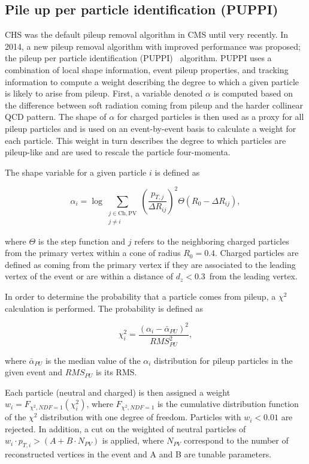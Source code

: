 \subsection{Pile up per particle identification (PUPPI)}
\label{subsub:objreco:puppi}
CHS was the default pileup removal algorithm in CMS until very recently. In 2014, a new pileup removal algorithm with improved performance was proposed; the pileup per particle identification (PUPPI)~\cite{Bertolini2014} algorithm.
PUPPI uses a combination of local shape information, event pileup properties, and tracking information to compute a weight describing the degree to which a given particle is likely to arise from pileup.
First, a variable denoted $\alpha$ is computed based on the difference between soft radiation coming from pileup and the harder collinear QCD pattern. The shape of $\alpha$ for charged particles is then used as a proxy for all pileup particles and is used on an event-by-event basis to calculate a weight for each particle. This weight in turn describes the degree to which particles are pileup-like and are used to rescale the particle four-momenta.

The shape variable for a given particle $i$ is defined as

\begin{equation}
  \alpha_i = \log \sum_{\substack{j \in \mathrm{Ch,PV} \\ j \neq i}} \left(\frac{p_{T,j}}{\Delta R_{ij}}\right)^{2} \Theta(R_0 - \Delta R_{ij}),
\end{equation}

where $\Theta$ is the step function and $j$ refers to the neighboring charged particles from the primary vertex within a cone of radius $R_0=0.4$. Charged particles are defined as coming from the primary vertex if they are associated to the leading vertex of the event or are within a distance of $d_z < $0.3~\cm from the leading vertex. 

In order to determine the probability that a particle comes from pileup, a $\chi^{2}$ calculation is performed. The probability is defined as

\begin{equation}
\chi^{2}_{i} = \frac{(\alpha_i -  \bar{\alpha}_{PU})^{2}}{RMS_{PU}^{2}},
\end{equation}

where $\bar{\alpha}_{PU}$ is the median value of the $\alpha_i$ distribution for pileup particles in the given event and $RMS_{PU}$ is its RMS.

Each particle (neutral and charged) is then assigned a weight $w_i = F_{\chi^2,NDF=1}(\chi^2_i)$, where $F_{\chi^2,NDF=1}$ is the cumulative distribution function of the $\chi^2$ distribution with one degree of freedom. Particles with $w_{i}<0.01$ are rejected.
In addition, a cut on the weighted \PT of neutral particles of $w_{i} \cdot p_{T,i} >  (A + B \cdot N_{PV})$ \GeV is applied, where $N_{PV}$ correspond to the number of reconstructed vertices in the event and A and B are tunable parameters. 

